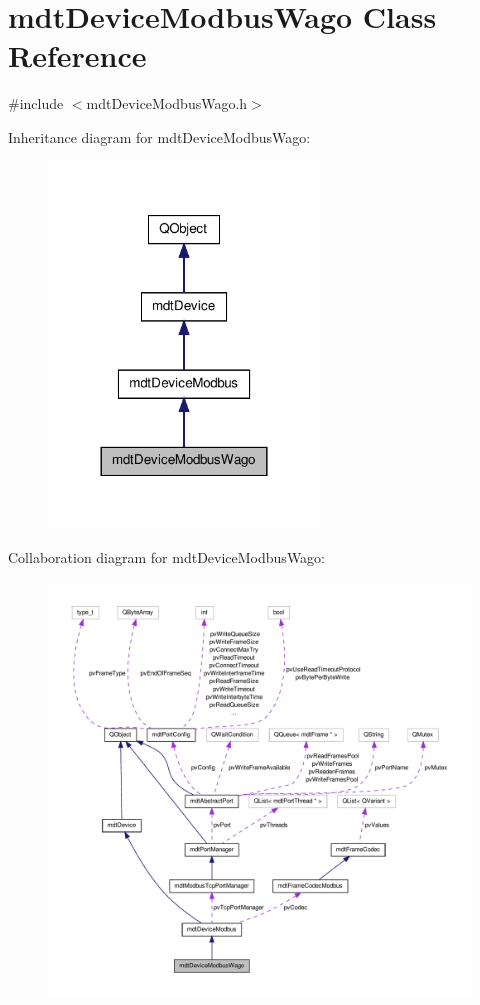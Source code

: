 \hypertarget{classmdt_device_modbus_wago}{\section{mdt\-Device\-Modbus\-Wago Class Reference}
\label{classmdt_device_modbus_wago}
}


{\ttfamily \#include $<$mdt\-Device\-Modbus\-Wago.\-h$>$}



Inheritance diagram for mdt\-Device\-Modbus\-Wago\-:\nopagebreak
\begin{figure}[H]
\begin{center}
\leavevmode
\includegraphics[width=204pt]{classmdt_device_modbus_wago__inherit__graph}
\end{center}
\end{figure}


Collaboration diagram for mdt\-Device\-Modbus\-Wago\-:\nopagebreak
\begin{figure}[H]
\begin{center}
\leavevmode
\includegraphics[width=350pt]{classmdt_device_modbus_wago__coll__graph}
\end{center}
\end{figure}
